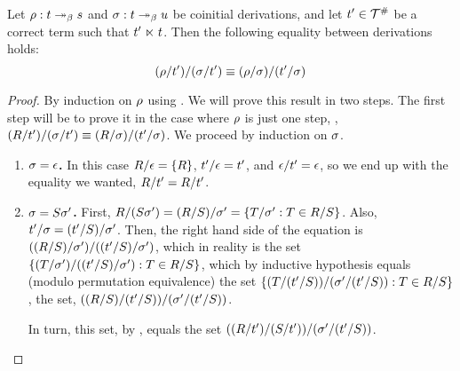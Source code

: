 \begin{lemma}
Let $\rho : t \mathrel{\twoheadrightarrow_\beta} s$ and $\sigma : t \mathrel{\twoheadrightarrow_\beta} u$ be coinitial derivations,
and let $t' \in \mathcal{T}^{\mathtt{\#}}$ be a correct term such that $t' \mathrel{\ltimes} t$.
Then the following equality between derivations holds:
\[
  (\rho/t')/(\sigma/t') \equiv (\rho/\sigma)/(t'/\sigma)
\]
\end{lemma}
\begin{proof}
By induction on $\rho$ using .
We will prove this result in two steps. The first step will be to prove it in the case where $\rho$ is just one step, \ie, $(R / t') / (\sigma / t') \equiv (R / \sigma) / (t' / \sigma)$.
We proceed by induction on $\sigma$.
\begin{enumerate}
  \item {\bf $\sigma = \epsilon$.}
    In this case $R / \epsilon = \{R\}$, $t' / \epsilon = t'$, and $\epsilon / t' = \epsilon$,
    so we end up with the equality we wanted, $R / t' = R / t'$.
  \item {\bf $\sigma = S \sigma'$.}
    First, $R / (S \sigma') = (R / S) / \sigma'
            = \{T / \sigma' : T \in R / S\}$.
    Also, $t' / \sigma = (t' / S) / \sigma'$.
    Then, the right hand side of the equation is
    $((R / S) / \sigma') / ((t' / S) / \sigma')$,
    which in reality is the set
    $\{(T / \sigma') / ((t' / S) / \sigma') : T \in R / S\}$,
    which by inductive hypothesis equals (modulo permutation equivalence) the set
    $\{(T / (t' / S)) / (\sigma' / (t' / S)) : T \in R / S\}$,
    \ie the set, $((R / S) / (t' / S)) / (\sigma' / (t' / S))$.

    In turn, this set, by , equals the set
    $((R / t') / (S / t')) / (\sigma' / (t' / S))$.


\end{enumerate}
\end{proof}

